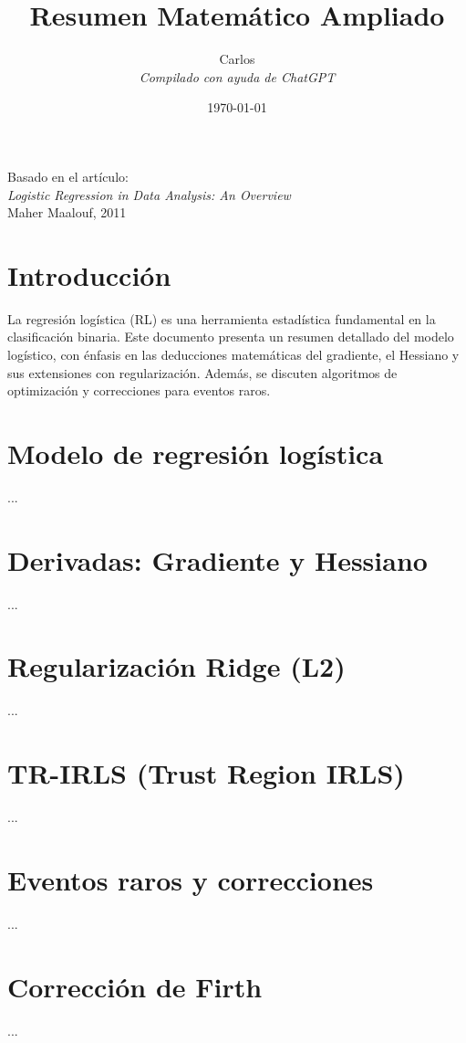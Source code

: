 \documentclass[12pt]{report}
\title{\textbf{Resumen Matem\'atico Ampliado}}
\author{Carlos \\ \textit{Compilado con ayuda de ChatGPT}}
\date{\today}
\begin{document}
\maketitle

\begin{center}
    \Large
    Basado en el art\'iculo: \\ 
    \textit{Logistic Regression in Data Analysis: An Overview} \\ 
    Maher Maalouf, 2011
\end{center}

\tableofcontents
\newpage

\chapter{Introducci\'on}
La regresi\'on log\'istica (RL) es una herramienta estad\'istica fundamental en la clasificaci\'on binaria. Este documento presenta un resumen detallado del modelo log\'istico, con \'enfasis en las deducciones matem\'aticas del gradiente, el Hessiano y sus extensiones con regularizaci\'on. Adem\'as, se discuten algoritmos de optimizaci\'on y correcciones para eventos raros.

\chapter{Modelo de regresi\'on log\'istica}
...

\chapter{Derivadas: Gradiente y Hessiano}
...

\chapter{Regularizaci\'on Ridge (L2)}
...

\chapter{TR-IRLS (Trust Region IRLS)}
...

\chapter{Eventos raros y correcciones}
...

\chapter{Correcci\'on de Firth}
...
\end{document}
